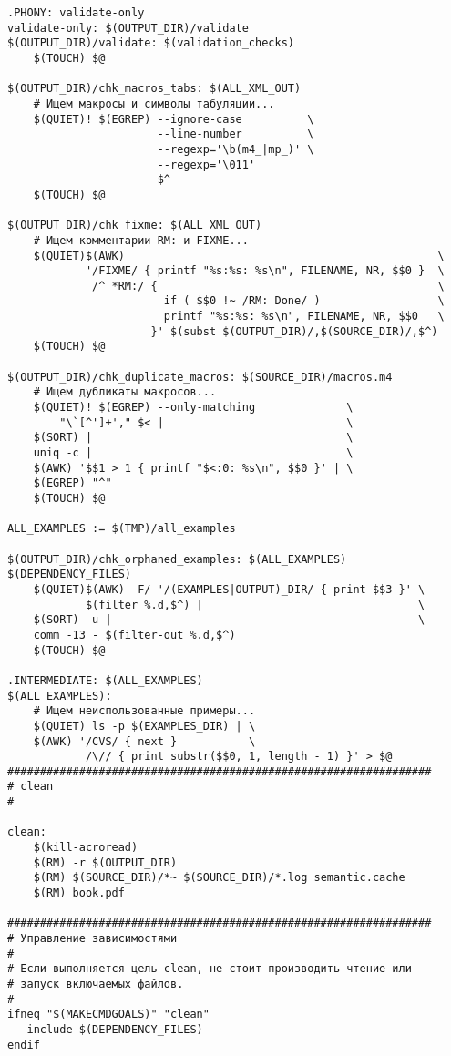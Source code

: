{\begin{verbatim}
.PHONY: validate-only
validate-only: $(OUTPUT_DIR)/validate
$(OUTPUT_DIR)/validate: $(validation_checks)
    $(TOUCH) $@

$(OUTPUT_DIR)/chk_macros_tabs: $(ALL_XML_OUT)
    # Ищем макросы и символы табуляции...
    $(QUIET)! $(EGREP) --ignore-case          \
                       --line-number          \
                       --regexp='\b(m4_|mp_)' \
                       --regexp='\011'
                       $^
    $(TOUCH) $@

$(OUTPUT_DIR)/chk_fixme: $(ALL_XML_OUT)
    # Ищем комментарии RM: и FIXME...
    $(QUIET)$(AWK)                                                \
            '/FIXME/ { printf "%s:%s: %s\n", FILENAME, NR, $$0 }  \
             /^ *RM:/ {                                           \
                        if ( $$0 !~ /RM: Done/ )                  \
                        printf "%s:%s: %s\n", FILENAME, NR, $$0   \
                      }' $(subst $(OUTPUT_DIR)/,$(SOURCE_DIR)/,$^) 
    $(TOUCH) $@ 

$(OUTPUT_DIR)/chk_duplicate_macros: $(SOURCE_DIR)/macros.m4
    # Ищем дубликаты макросов...
    $(QUIET)! $(EGREP) --only-matching              \
        "\`[^']+'," $< |                            \
    $(SORT) |                                       \
    uniq -c |                                       \
    $(AWK) '$$1 > 1 { printf "$<:0: %s\n", $$0 }' | \
    $(EGREP) "^"
    $(TOUCH) $@

ALL_EXAMPLES := $(TMP)/all_examples

$(OUTPUT_DIR)/chk_orphaned_examples: $(ALL_EXAMPLES) $(DEPENDENCY_FILES)
    $(QUIET)$(AWK) -F/ '/(EXAMPLES|OUTPUT)_DIR/ { print $$3 }' \
            $(filter %.d,$^) |                                 \
    $(SORT) -u |                                               \
    comm -13 - $(filter-out %.d,$^)
    $(TOUCH) $@

.INTERMEDIATE: $(ALL_EXAMPLES)
$(ALL_EXAMPLES):
    # Ищем неиспользованные примеры...
    $(QUIET) ls -p $(EXAMPLES_DIR) | \
    $(AWK) '/CVS/ { next }           \
            /\// { print substr($$0, 1, length - 1) }' > $@
#################################################################
# clean
#

clean:
    $(kill-acroread)
    $(RM) -r $(OUTPUT_DIR)
    $(RM) $(SOURCE_DIR)/*~ $(SOURCE_DIR)/*.log semantic.cache
    $(RM) book.pdf

#################################################################
# Управление зависимостями
#
# Если выполняется цель clean, не стоит производить чтение или
# запуск включаемых файлов.
#
ifneq "$(MAKECMDGOALS)" "clean"
  -include $(DEPENDENCY_FILES)
endif


\end{verbatim}}
